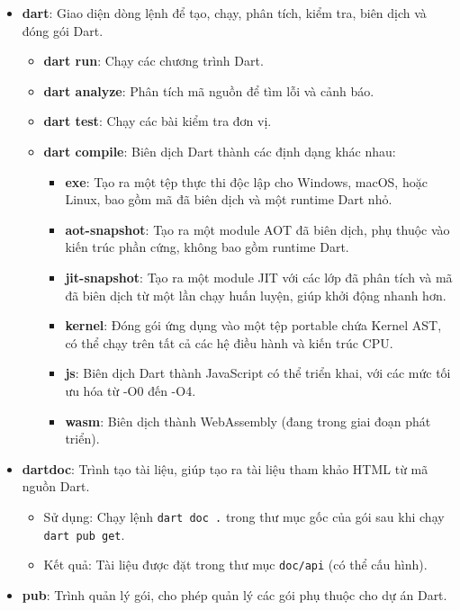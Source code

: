 \documentclass[../DoAn.tex]{subfiles}
\numberwithin{figure}{chapter}
\begin{document}
\begin{itemize}
    \item \textbf{dart}: Giao diện dòng lệnh để tạo, chạy, phân tích, kiểm tra, biên dịch và đóng gói Dart.
    \begin{itemize}
        \item \textbf{dart run}: Chạy các chương trình Dart.
        \item \textbf{dart analyze}: Phân tích mã nguồn để tìm lỗi và cảnh báo.
        \item \textbf{dart test}: Chạy các bài kiểm tra đơn vị.
        \item \textbf{dart compile}: Biên dịch Dart thành các định dạng khác nhau:
        \begin{itemize}
            \item \textbf{exe}: Tạo ra một tệp thực thi độc lập cho Windows, macOS, hoặc Linux, bao gồm mã đã biên dịch và một runtime Dart nhỏ.
            \item \textbf{aot-snapshot}: Tạo ra một module AOT đã biên dịch, phụ thuộc vào kiến trúc phần cứng, không bao gồm runtime Dart.
            \item \textbf{jit-snapshot}: Tạo ra một module JIT với các lớp đã phân tích và mã đã biên dịch từ một lần chạy huấn luyện, giúp khởi động nhanh hơn.
            \item \textbf{kernel}: Đóng gói ứng dụng vào một tệp portable chứa Kernel AST, có thể chạy trên tất cả các hệ điều hành và kiến trúc CPU.
            \item \textbf{js}: Biên dịch Dart thành JavaScript có thể triển khai, với các mức tối ưu hóa từ -O0 đến -O4.
            \item \textbf{wasm}: Biên dịch thành WebAssembly (đang trong giai đoạn phát triển).
        \end{itemize}
    \end{itemize}
    \item \textbf{dartdoc}: Trình tạo tài liệu, giúp tạo ra tài liệu tham khảo HTML từ mã nguồn Dart.
    \begin{itemize}
        \item Sử dụng: Chạy lệnh \texttt{dart doc .} trong thư mục gốc của gói sau khi chạy \texttt{dart pub get}.
        \item Kết quả: Tài liệu được đặt trong thư mục \texttt{doc/api} (có thể cấu hình).
    \end{itemize}
    \item \textbf{pub}: Trình quản lý gói, cho phép quản lý các gói phụ thuộc cho dự án Dart.

\end{itemize}
\end{document}
